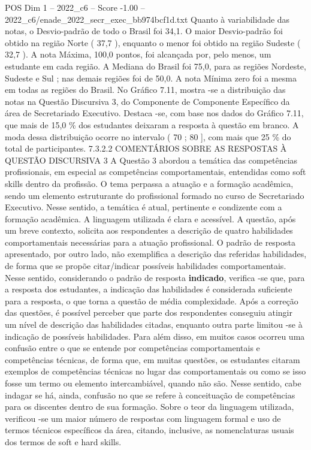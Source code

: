 \begin{textsample}{POS Dim 1 – 2022\_c6 – Score -1.00 – 2022\_c6/enade\_2022\_secr\_exec\_bb974bcf1d.txt}
Quanto à variabilidade das notas, o Desvio-padrão de todo o Brasil foi 34,1.
O maior Desvio-padrão foi obtido na região Norte ( 37,7 ), enquanto o menor foi obtido na região Sudeste ( 32,7 ).
A nota Máxima, 100,0 pontos, foi alcançada por, pelo menos, um estudante em cada região.
A Mediana do Brasil foi 75,0, para as regiões Nordeste, Sudeste e Sul ; nas demais regiões foi de 50,0.
A nota Mínima zero foi a mesma em todas as regiões do Brasil.
No Gráfico 7.11, mostra -se a distribuição das notas na Questão Discursiva 3, do Componente de Componente Específico da área de Secretariado Executivo.
Destaca -se, com base nos dados do Gráfico 7.11, que mais de 15,0 \% dos estudantes deixaram a resposta à questão em branco.
A moda dessa distribuição ocorre no intervalo ( 70 ; 80 ], com mais que 25 \% do total de participantes. 7.3.2.2 COMENTÁRIOS SOBRE AS RESPOSTAS À QUESTÃO DISCURSIVA 3 A Questão 3 abordou a temática das competências profissionais, em especial as competências comportamentais, entendidas como soft skills dentro da profissão.
O tema perpassa a atuação e a formação acadêmica, sendo um elemento estruturante do profissional formado no curso de Secretariado Executivo.
Nesse sentido, a temática é atual, pertinente e condizente com a formação acadêmica.
A linguagem utilizada é clara e acessível.
A questão, após um breve contexto, solicita aos respondentes a descrição de quatro habilidades comportamentais necessárias para a atuação profissional.
O padrão de resposta apresentado, por outro lado, não exemplifica a descrição das referidas habilidades, de forma que se propõe citar/indicar possíveis habilidades comportamentais.
Nesse sentido, considerando o padrão de resposta \textbf{indicado}, verifica -se que, para a resposta dos estudantes, a indicação das habilidades é considerada suficiente para a resposta, o que torna a questão de média complexidade.
Após a correção das questões, é possível perceber que parte dos respondentes conseguiu atingir um nível de descrição das habilidades citadas, enquanto outra parte limitou -se à indicação de possíveis habilidades.
Para além disso, em muitos casos ocorreu uma confusão entre o que se entende por competências comportamentais e competências técnicas, de forma que, em muitas questões, os estudantes citaram exemplos de competências técnicas no lugar das comportamentais ou como se isso fosse um termo ou elemento intercambiável, quando não são.
Nesse sentido, cabe indagar se há, ainda, confusão no que se refere à conceituação de competências para os discentes dentro de sua formação.
Sobre o teor da linguagem utilizada, verificou -se um maior número de respostas com linguagem formal e uso de termos técnicos específicos da área, citando, inclusive, as nomenclaturas usuais dos termos de soft e hard skills.

\end{textsample}
